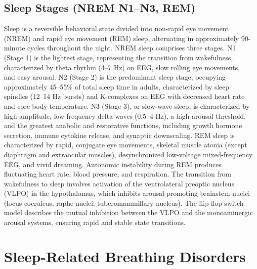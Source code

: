 \subsection{Sleep Stages (NREM N1--N3, REM)}
\label{sec:Sleep Stages}
Sleep is a reversible behavioral state divided into non-rapid eye movement (NREM) and rapid eye movement (REM) sleep, alternating in approximately 90-minute cycles throughout the night. NREM sleep comprises three stages. N1 (Stage 1) is the lightest stage, representing the transition from wakefulness, characterized by theta rhythm (4--7 Hz) on EEG, slow rolling eye movements, and easy arousal. N2 (Stage 2) is the predominant sleep stage, occupying approximately 45--55\% of total sleep time in adults, characterized by sleep spindles (12--14 Hz bursts) and K-complexes on EEG with decreased heart rate and core body temperature. N3 (Stage 3), or slow-wave sleep, is characterized by high-amplitude, low-frequency delta waves (0.5--4 Hz), a high arousal threshold, and the greatest anabolic and restorative functions, including growth hormone secretion, immune cytokine release, and synaptic downscaling. REM sleep is characterized by rapid, conjugate eye movements, skeletal muscle atonia (except diaphragm and extraocular muscles), desynchronized low-voltage mixed-frequency EEG, and vivid dreaming. Autonomic instability during REM produces fluctuating heart rate, blood pressure, and respiration. The transition from wakefulness to sleep involves activation of the ventrolateral preoptic nucleus (VLPO) in the hypothalamus, which inhibits arousal-promoting brainstem nuclei (locus coeruleus, raphe nuclei, tuberomammillary nucleus). The flip-flop switch model describes the mutual inhibition between the VLPO and the monoaminergic arousal systems, ensuring rapid and stable state transitions.

\section{Sleep-Related Breathing Disorders}





